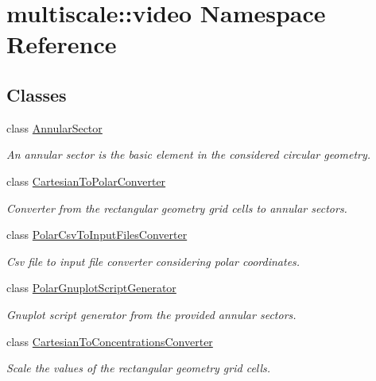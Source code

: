 \hypertarget{namespacemultiscale_1_1video}{\section{multiscale\-:\-:video \-Namespace \-Reference}
\label{namespacemultiscale_1_1video}
}
\subsection*{\-Classes}
\begin{DoxyCompactItemize}
\item 
class \hyperlink{classmultiscale_1_1video_1_1AnnularSector}{\-Annular\-Sector}
\begin{DoxyCompactList}\small\item\em \-An annular sector is the basic element in the considered circular geometry. \end{DoxyCompactList}\item 
class \hyperlink{classmultiscale_1_1video_1_1CartesianToPolarConverter}{\-Cartesian\-To\-Polar\-Converter}
\begin{DoxyCompactList}\small\item\em \-Converter from the rectangular geometry grid cells to annular sectors. \end{DoxyCompactList}\item 
class \hyperlink{classmultiscale_1_1video_1_1PolarCsvToInputFilesConverter}{\-Polar\-Csv\-To\-Input\-Files\-Converter}
\begin{DoxyCompactList}\small\item\em \-Csv file to input file converter considering polar coordinates. \end{DoxyCompactList}\item 
class \hyperlink{classmultiscale_1_1video_1_1PolarGnuplotScriptGenerator}{\-Polar\-Gnuplot\-Script\-Generator}
\begin{DoxyCompactList}\small\item\em \-Gnuplot script generator from the provided annular sectors. \end{DoxyCompactList}\item 
class \hyperlink{classmultiscale_1_1video_1_1CartesianToConcentrationsConverter}{\-Cartesian\-To\-Concentrations\-Converter}
\begin{DoxyCompactList}\small\item\em \-Scale the values of the rectangular geometry grid cells. \end{DoxyCompactList}\item 

\end{DoxyCompactItemize}
